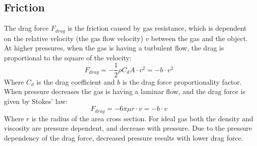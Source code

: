 \documentclass[\main/master.tex]{subfiles}
\begin{document}
\subsection{Friction}
The drag force $F_{drag}$ is the friction caused by gas resistance, which is dependent on the relative velocity (the gas flow velocity) $v$ between the gas and the object. At higher pressures, when the gas is having a turbulent flow, the drag is proportional to the square of the velocity:
\begin{equation}
F_{drag} = -\frac{1}{2}\rho C_d A \cdot v^2 = -b\cdot v^2 
\label{eqn:drag force}
\end{equation}
Where $C_d$ is the drag coefficient and $b$ is the drag force proportionality factor. When pressure decreases the gas is having a laminar flow, and the drag force is given by Stokes' law:
\begin{equation}
F_{drag} = -6\pi\mu r\cdot v = -b\cdot v
\label{eqn:drag force}
\end{equation}
Where $r$ is the radius of the area cross section. For ideal gas both the density and viscosity are pressure dependent, and decrease with pressure. Due to the pressure dependency of the drag force, decreased pressure results with lower drag force.
\end{document}
